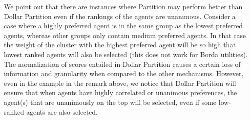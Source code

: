 \documentclass[letterpaper]{article}
\newtheorem{theorem}{Theorem}
\newcommand{\qed}{\unskip\hspace*{1em}\hspace{\fill}$\Box$}
\newenvironment{proof}[1][Proof]{\begin{trivlist}
 \item[\hskip \labelsep {\it #1:}]}{%
 \qed\end{trivlist}}
\DeclarePairedDelimiter{\ceil}{\lceil}{\rceil}
\DeclarePairedDelimiter{\floor}{\lfloor}{\rfloor}
\begin{document}
We point out that there are instances where Partition may perform better than Dollar Partition even if the rankings of the agents are unanimous. Consider a case where a highly preferred agent is in the same group as the lowest preferred agents, whereas other groups only contain medium preferred agents. In that case the weight of the cluster with the highest preferred agent will be so high that lowest ranked agents will also be selected (this does not work for Borda utilities). 
The normalization of scores entailed in Dollar Partition causes a certain loss of information and granularity when compared to the other mechanisms.
However, even in the example in the remark above, we notice that Dollar Partition will ensure that when agents have highly correlated or unanimous preferences, the agent(s) that are unanimously on the top will be selected, even if some low-ranked agents are also selected. 



%
%
\end{document}
